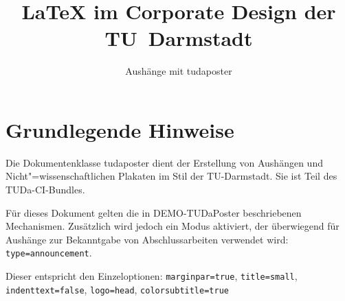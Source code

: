 \documentclass[
	ngerman,%
	paper=a4,%
	accentcolor=9c,%
	type=announcement,
	footer=true,
]{tudaposter}
\title{\LaTeX{} im Corporate Design der TU~Darmstadt}
\subtitle{Aushänge mit tudaposter}
\newcommand*{\code}[1]{\texttt{#1}}
\begin{document}
\maketitle

\section*{Grundlegende Hinweise}

Die Dokumentenklasse tudaposter dient der Erstellung von Aushängen und Nicht"=wissenschaftlichen Plakaten im Stil der TU-Darmstadt. Sie ist Teil des TUDa-CI-Bundles.

Für dieses Dokument gelten die in DEMO-TUDaPoster beschriebenen Mechanismen. Zusätzlich wird jedoch ein Modus aktiviert, der überwiegend für Aushänge zur Bekanntgabe von Abschlussarbeiten verwendet wird: \code{type=announcement}.

Dieser entspricht den Einzeloptionen: \code{marginpar=true}, \code{title=small}, \code{indenttext=false}, \code{logo=head}, \code{colorsubtitle=true}
\end{document}
